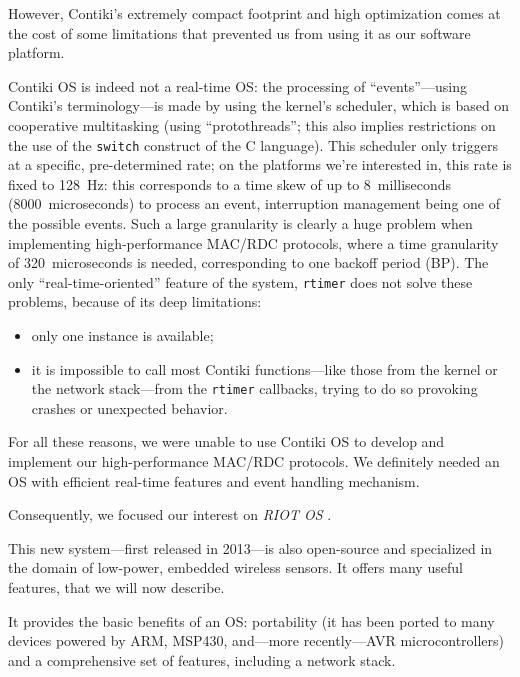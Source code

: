 \documentclass[a4paper,twoside]{article}
\begin{document}
\bigskip

However, Contiki's extremely compact footprint and high optimization comes
at the cost of some limitations that prevented us from using it as our
software platform.

Contiki OS is indeed not a real-time OS: the processing of ``events''---using
Contiki's terminology---is made by using the kernel's scheduler, which is
based on cooperative multitasking (using ``protothreads''; this also implies
restrictions on the use of the \texttt{switch} construct of the C language).
This scheduler only triggers at a specific, pre-determined rate; on
the platforms we're interested in, this rate is fixed to 128~Hz:
this corresponds to a time skew of up to 8~milliseconds
(8000~microseconds) to process an event, interruption management being
one of the possible events. Such a large granularity is clearly
a huge problem when implementing high-performance MAC/RDC protocols,
where a time granularity of 320~microseconds is needed, corresponding
to one backoff period (BP). The only ``real-time-oriented'' feature
of the system, \texttt{rtimer} does not solve these problems, because
of its deep limitations:
\begin{itemize}
\item only one instance is available;
\item it is impossible to call most Contiki functions---like those from
the kernel or the network stack---from the \texttt{rtimer} callbacks,
trying to do so provoking crashes or unexpected behavior.
\end{itemize}

For all these reasons, we were unable to use Contiki OS to develop and
implement our high-performance MAC/RDC protocols. We definitely needed
an OS with efficient real-time features and event handling mechanism.

\bigskip

Consequently, we focused our interest on \emph{RIOT OS} \cite{RIOT}.

This new system---first released in 2013---is also open-source and
specialized in the domain of low-power, embedded wireless sensors.
It offers many useful features, that we will now describe.

It provides the basic benefits of an OS: portability (it has been ported
to many devices powered by ARM, MSP430, and---more recently---AVR
microcontrollers) and a comprehensive set of features, including
a network stack.
\end{document}
